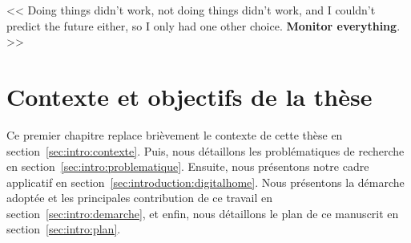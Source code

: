 \begin{savequote}[6cm]
<< Doing things didn't work, not doing things didn't work, and I couldn't predict the future either, so I only had one other choice. \textbf{Monitor everything}. >>
\end{savequote}
\chapter{Contexte et objectifs de la thèse}
\chaptertoc

Ce premier chapitre replace brièvement le contexte de cette thèse en section~\ref{sec:intro:contexte}. Puis, nous détaillons les problématiques de recherche en section~\ref{sec:intro:problematique}. Ensuite, nous présentons notre cadre applicatif en section~\ref{sec:introduction:digitalhome}. Nous présentons la démarche adoptée et les principales contribution de ce travail en section~\ref{sec:intro:demarche}, et enfin, nous détaillons le plan de ce manuscrit en section~\ref{sec:intro:plan}.







